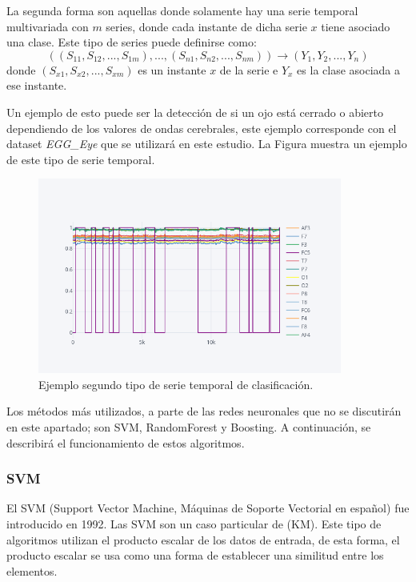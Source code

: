 La segunda forma son aquellas donde solamente hay una serie temporal multivariada con $m$ series, donde cada instante de dicha serie $x$ tiene asociado una clase. Este tipo de series puede definirse como:\newline
$$ ((S_{11},S_{12}, ..., S_{1m}), ...,(S_{n1},S_{n2}, ..., S_{nm})) \rightarrow (Y_1, Y_2, ..., Y_n) $$
\noindent donde $(S_{x1}, S_{x2}, ..., S_{xm})$ es un instante $x$ de la serie e $Y_x$ es la clase asociada a ese instante.\newline

Un ejemplo de esto puede ser la detección de si un ojo está cerrado o abierto dependiendo de los valores de ondas cerebrales, este ejemplo corresponde con el dataset \textit{EGG\_Eye} que se utilizará en este estudio. La Figura muestra un ejemplo de este tipo de serie temporal.\newline
\newpage

\begin{figure}[H]
	\centering
	\includegraphics[width=100mm]{imagenes/egg_eye_example.png}
	\caption{Ejemplo segundo tipo de serie temporal de clasificación.}
	\label{fig:egg_eye_example}
\end{figure}
\verticalspace

Los métodos más utilizados, a parte de las redes neuronales que no se discutirán en este apartado; son SVM, RandomForest y Boosting. A continuación, se describirá el funcionamiento de estos algoritmos.\newline

\subsubsection{SVM}
El SVM (Support Vector Machine, Máquinas de Soporte Vectorial en español) \cite{boser1992training} fue introducido en 1992. Las SVM son un caso particular de  (KM). Este tipo de algoritmos utilizan el producto escalar de los datos de entrada, de esta forma, el producto escalar se usa como una forma de establecer una similitud entre los elementos.\newline

